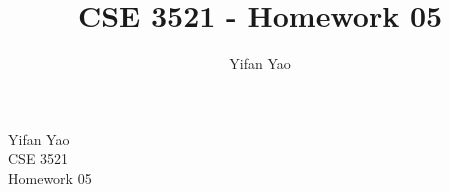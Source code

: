 \documentclass[11pt, oneside]{article}      %
\title{CSE 3521 - Homework 05}
\author{Yifan Yao}
\begin{document}

\begin{flushleft}
Yifan Yao \\
CSE 3521 \\
Homework 05 \\
\end{flushleft}
\end{document}
